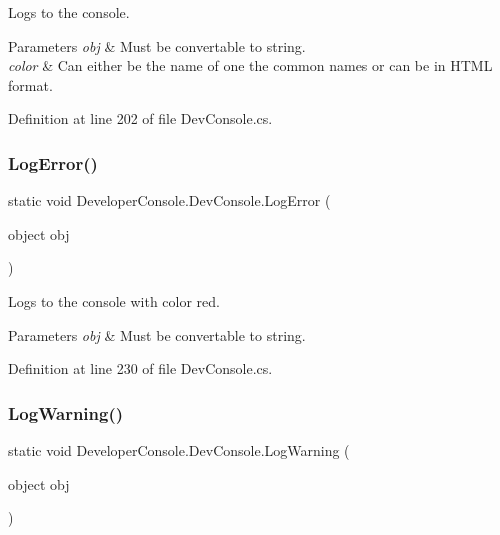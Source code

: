 Logs to the console. 


\begin{DoxyParams}{Parameters}
{\em obj} & Must be convertable to string.\\
\hline
{\em color} & Can either be the name of one the common names or can be in H\+T\+ML format.\\
\hline
\end{DoxyParams}


Definition at line 202 of file Dev\+Console.\+cs.

\mbox{\label{class_developer_console_1_1_dev_console_a4756f307082a11bd36ce86637b8a8dfc}} 
\subsubsection{\texorpdfstring{Log\+Error()}{LogError()}}
{\footnotesize\ttfamily static void Developer\+Console.\+Dev\+Console.\+Log\+Error (\begin{DoxyParamCaption}\item[{object}]{obj }\end{DoxyParamCaption})\hspace{0.3cm}{\ttfamily [static]}}



Logs to the console with color red. 


\begin{DoxyParams}{Parameters}
{\em obj} & Must be convertable to string.\\
\hline
\end{DoxyParams}


Definition at line 230 of file Dev\+Console.\+cs.

\mbox{\label{class_developer_console_1_1_dev_console_aad85b1607d48da07b04c2bf4417ac6bf}} 
\subsubsection{\texorpdfstring{Log\+Warning()}{LogWarning()}}
{\footnotesize\ttfamily static void Developer\+Console.\+Dev\+Console.\+Log\+Warning (\begin{DoxyParamCaption}\item[{object}]{obj }\end{DoxyParamCaption})\hspace{0.3cm}{\ttfamily [static]}}



